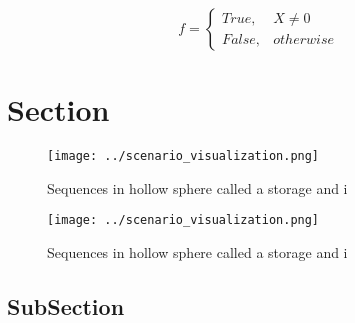 \documentclass[a4paper]{article}
\begin{document}
\begin{equation}   f =
\begin{cases} True, & X \neq 0\\
False, & otherwise
\end{cases}
\end{equation}

\section{Section}

\begin{figure}
\centering
\texttt{[image: ../scenario\_visualization.png]}
\caption{Sequences in hollow sphere called a storage and i
}
\end{figure}
 
\begin{figure}
\centering
\texttt{[image: ../scenario\_visualization.png]}
\caption{Sequences in hollow sphere called a storage and i
}
\end{figure}
 
\subsection{SubSection}
\end{document}
